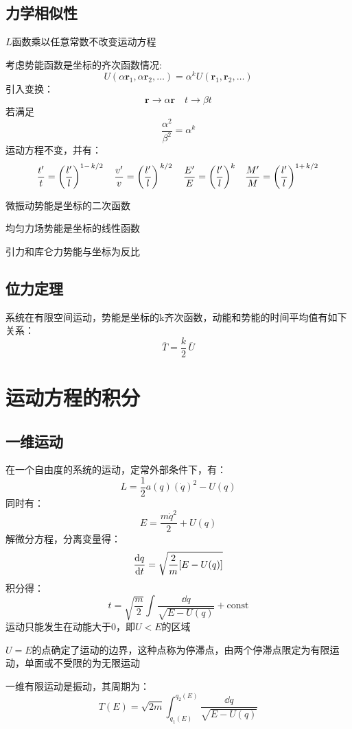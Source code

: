 \documentclass[12pt]{report}
\newcommand{\const}{\mathrm{const}}
\newcommand{\vecb}[1]{\boldsymbol{#1}}
\begin{document}
\subsection{力学相似性}
$L$函数乘以任意常数不改变运动方程\par
考虑势能函数是坐标的齐次函数情况:
$$U(\alpha\vecb{r}_1,\alpha\vecb{r}_2,\dots)={\alpha}^k U(\vecb{r}_1,\vecb{r}_2,\dots)$$
引入变换：
$$\vecb{r}\rightarrow \alpha \vecb{r} \quad t \rightarrow \beta t$$
若满足$$\frac{{\alpha}^2}{{\beta}^2}={\alpha}^k$$
运动方程不变，并有：
$$\frac{t'}{t}=\qty(\frac{l'}{l})^{1-\flatfrac{k}{2}}\quad
\frac{v'}{v}=\qty(\frac{l'}{l})^{\flatfrac{k}{2}}\quad
\frac{E'}{E}=\qty(\frac{l'}{l})^{k}\quad
\frac{M'}{M}=\qty(\frac{l'}{l})^{1+\flatfrac{k}{2}}$$\par
微振动势能是坐标的二次函数\par
均匀力场势能是坐标的线性函数\par
引力和库仑力势能与坐标为反比
\subsection{位力定理}
系统在有限空间运动，势能是坐标的k齐次函数，动能和势能的时间平均值有如下关系：
\begin{equation}
    \overline{T}=\frac{k}{2} \,\overline{U}
    \label{位力定理}
\end{equation}

\section{运动方程的积分}
\subsection{一维运动}
在一个自由度的系统的运动，定常外部条件下，有：
$$L=\frac{1}{2}a(q) (\dot{q})^2-U(q)$$
同时有：
$$E=\frac{m\dot{q}^2}{2}+U(q)$$
解微分方程，分离变量得：
$$\dv{q}{t}=\sqrt{\frac{2}{m}[E-U(q)]}$$
积分得：
\begin{equation}
    t=\sqrt{\frac{m}{2}} \int \frac{\dd q}{\sqrt{E-U(q)}} +\const
\end{equation}
运动只能发生在动能大于0，即$U<E$的区域\par 
$U=E$的点确定了运动的边界，这种点称为停滞点，由两个停滞点限定为有限运动，单面或不受限的为无限运动\par
一维有限运动是振动，其周期为：
\begin{equation}
T(E)=\sqrt{2m} \int_{q_1 (E)}^{q_2 (E)} \frac{\dd q}{\sqrt{E-U(q)}}
\label{一维有限振动周期}
\end{equation}
\end{document}
